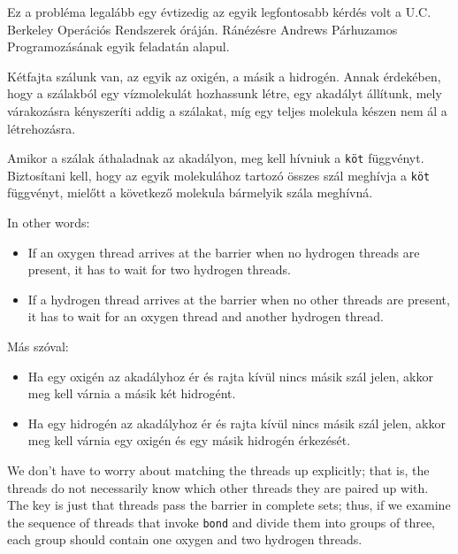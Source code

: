 \documentclass{book}
\begin{document}
Ez a probléma legalább egy évtizedig az egyik legfontosabb kérdés
volt a U.C. Berkeley Operációs Rendszerek óráján. Ránézésre Andrews
Párhuzamos Programozásának \cite{andrews} egyik feladatán alapul.

Kétfajta szálunk van, az egyik az oxigén, a másik a hidrogén.
Annak érdekében, hogy a szálakból egy vízmolekulát hozhassunk létre,
egy akadályt állítunk, mely várakozásra kényszeríti addig a szálakat,
míg egy teljes molekula készen nem ál a létrehozásra.

Amikor a szálak áthaladnak az akadályon, meg kell hívniuk a {\tt köt}
függvényt. Biztosítani kell, hogy az egyik molekulához tartozó összes szál
meghívja a {\tt köt} függvényt, mielőtt a következő molekula
bármelyik szála meghívná.


In other words:

\begin{itemize}

\item If an oxygen thread arrives at the barrier when no
hydrogen threads are present, it has to wait for two
hydrogen threads.

\item If a hydrogen thread arrives at the barrier when
no other threads are present, it has to wait for an
oxygen thread and another hydrogen thread.

\end{itemize}

Más szóval:

\begin{itemize}

\item Ha egy oxigén az akadályhoz ér és rajta kívül nincs másik szál
jelen, akkor meg kell várnia a másik két hidrogént.

\item Ha egy hidrogén az akadályhoz ér és rajta kívül nincs másik szál
jelen, akkor meg kell várnia egy oxigén és egy másik hidrogén érkezését.

\end{itemize}

We don't have to worry about matching the threads up explicitly; that
is, the threads do not necessarily know which other threads they are
paired up with.  The key is just that threads pass the barrier in
complete sets; thus, if we examine the sequence of threads that invoke
{\tt bond} and divide them into groups of three, each group should
contain one oxygen and two hydrogen threads.
\end{document}
